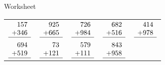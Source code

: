 \documentclass[20pt]{scrartcl}
\begin{document}
	\begin{center}
		\LARGE Worksheet
	\end{center}
	\begin{tabu} to \linewidth {XXXXX}
		$\begin{array}{r}
			157 \\
			+346 \\
			\hline
			\end{array}$
		
		&
		$\begin{array}{r}
			925 \\
			+665 \\
			\hline
			\end{array}$
		
		&
		$\begin{array}{r}
			726 \\
			+984 \\
			\hline
			\end{array}$
		
		&
		$\begin{array}{r}
			682 \\
			+516 \\
			\hline
			\end{array}$
		
		&
		$\begin{array}{r}
			414 \\
			+978 \\
			\hline
			\end{array}$
		

		\\
		$\begin{array}{r}
			694 \\
			+519 \\
			\hline
			\end{array}$
		
		&
		$\begin{array}{r}
			73 \\
			+121 \\
			\hline
			\end{array}$
		
		&
		$\begin{array}{r}
			579 \\
			+111 \\
			\hline
			\end{array}$
		
		&
		$\begin{array}{r}
			843 \\
			+958 \\
			\hline
			\end{array}$
		

\end{tabu}
\end{document}
